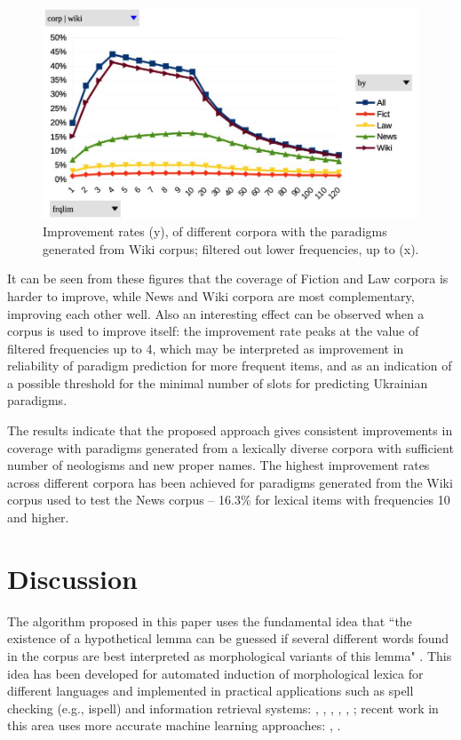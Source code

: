 \documentclass[11pt,a4paper]{article}
\begin{document}
\begin{figure}
	\includegraphics[width=\linewidth]{evaluation-improv-DiffNoTypWiki.jpg}
	\caption{Improvement rates (y), of different corpora with the paradigms generated from Wiki corpus; filtered out lower frequencies, up to (x).}
	\label{fig:pcDiffNoTypWiki}
\end{figure}


It can be seen from these figures that the coverage of Fiction and Law corpora is harder to improve, while News and Wiki corpora are most complementary, improving each other well. Also an interesting effect can be observed when a corpus is used to improve itself: the improvement rate peaks at the value of filtered frequencies up to 4, which may be interpreted as improvement in reliability of paradigm prediction for more frequent items, and as an indication of a possible threshold for the minimal number of slots for predicting Ukrainian paradigms.

The results indicate that the proposed approach gives consistent improvements in coverage with paradigms generated from a lexically diverse corpora with sufficient number of neologisms and new proper names. The highest improvement rates across different corpora has been achieved for paradigms generated from the Wiki corpus used to test the News corpus -- 16.3\% for lexical items with frequencies 10 and higher.



\section{Discussion}
\label{sec:Discussion}


The algorithm proposed in this paper uses the fundamental idea that ``the existence of a hypothetical lemma can be guessed if several different words found in the corpus are best interpreted as morphological variants of this lemma" \cite{clement2004morphology}. This idea has been developed for automated induction of morphological lexica for different languages and implemented in practical applications such as spell checking (e.g., ispell) and information retrieval systems: \cite{krovetz1993viewing}, \cite{grefenstette2002expanding}, \cite{segalovich2003fast},  \cite{clement2004morphology}, \cite{oliver2004enlarging}, \cite{sagot2005automatic}; recent work in this area uses more accurate machine learning approaches: \cite{vsnajder2013models}, \cite{ljubevsic2015predicting}.
\end{document}
